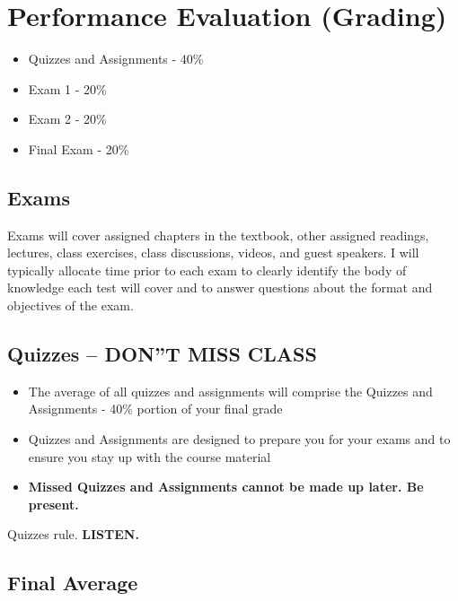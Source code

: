 \documentclass[
]{book}
\providecommand{\tightlist}{%
  \setlength{\itemsep}{0pt}\setlength{\parskip}{0pt}}
\theoremstyle{definition}
\theoremstyle{definition}
\theoremstyle{definition}
\theoremstyle{definition}
\theoremstyle{remark}
\begin{document}
\hypertarget{performance-evaluation-grading}{%
\section{Performance Evaluation (Grading)}\label{performance-evaluation-grading}}

\begin{itemize}
\tightlist
\item
  Quizzes and Assignments - 40\%
\item
  Exam 1 - 20\%
\item
  Exam 2 - 20\%
\item
  Final Exam - 20\%
\end{itemize}

\hypertarget{exams}{%
\subsection{Exams}\label{exams}}

Exams will cover assigned chapters in the textbook, other assigned readings, lectures, class exercises, class discussions, videos, and guest speakers. I will typically allocate time prior to each exam to clearly identify the body of knowledge each test will cover and to answer questions about the format and objectives of the exam.

\hypertarget{quizzes-dont-miss-class}{%
\subsection{\texorpdfstring{Quizzes -- \textbf{DON''T MISS CLASS}}{Quizzes -- DON''T MISS CLASS}}\label{quizzes-dont-miss-class}}

\begin{itemize}
\tightlist
\item
  The average of all quizzes and assignments will comprise the Quizzes and Assignments - 40\% portion of your final grade
\item
  Quizzes and Assignments are designed to prepare you for your exams and to ensure you stay up with the course material
\item
  \textbf{Missed Quizzes and Assignments cannot be made up later. Be present.}
\end{itemize}

Quizzes rule. \textbf{LISTEN.}

\hypertarget{final-average}{%
\subsection{Final Average}\label{final-average}}
\end{document}
